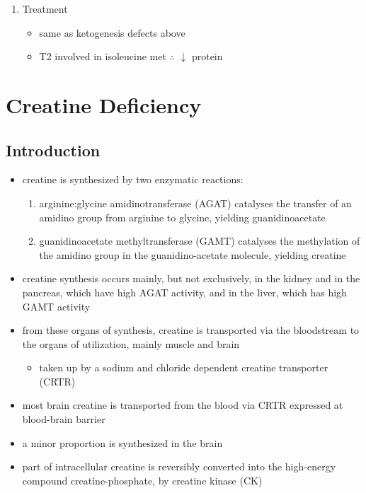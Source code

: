 \documentclass{scrartcl}
\begin{document}
\begin{enumerate}
\item Treatment
\label{sec:orgf50be0d}
\begin{itemize}
\item same as ketogenesis defects above
\item T2 involved in isoleucine met \(\therefore\) \(\downarrow\) protein
\end{itemize}
\end{enumerate}
\section{Creatine Deficiency}
\label{sec:org46144fe}
\subsection{Introduction}
\label{sec:orgdfe92b6}
\begin{itemize}
\item creatine is synthesized by two enzymatic reactions:
\begin{enumerate}
\item arginine:glycine amidinotransferase (AGAT) catalyses the
transfer of an amidino group from arginine to glycine, yielding
guanidinoacetate
\item guanidinoacetate methyltransferase (GAMT) catalyses the
methylation of the amidino group in the guanidino-acetate
molecule, yielding creatine
\end{enumerate}

\item creatine synthesis occurs mainly, but not exclusively, in the kidney
and in the pancreas, which have high AGAT activity, and in the
liver, which has high GAMT activity

\item from these organs of synthesis, creatine is transported via the
bloodstream to the organs of utilization, mainly muscle and brain
\begin{itemize}
\item taken up by a sodium and chloride dependent creatine transporter
(CRTR)
\end{itemize}

\item most brain creatine is transported from the blood via CRTR expressed
at blood-brain barrier
\item a minor proportion is synthesized in the brain

\item part of intracellular creatine is reversibly converted into the
high-energy compound creatine-phosphate, by creatine kinase (CK)


\end{itemize}
\end{document}
